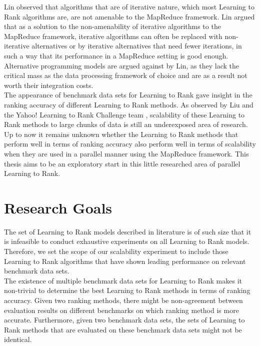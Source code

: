 Lin \cite{Lin2013} observed that algorithms that are of iterative nature, which most Learning to Rank algorithms are, are not amenable to the MapReduce framework. Lin argued that as a solution to the non-amenability of iterative algorithms to the MapReduce framework, iterative algorithms can often be replaced with non-iterative alternatives or by iterative alternatives that need fewer iterations, in such a way that its performance in a MapReduce setting is good enough. Alternative programming models are argued against by Lin, as they lack the critical mass as the data processing framework of choice and are as a result not worth their integration costs.\\

The appearance of benchmark data sets for Learning to Rank gave insight in the ranking accuracy of different Learning to Rank methods. As observed by Liu \cite{Liu2007} and the Yahoo! Learning to Rank Challenge team \cite{Chapelle2011b}, scalability of these Learning to Rank methods to large chunks of data is still an underexposed area of research. Up to now it remains unknown whether the Learning to Rank methods that perform well in terms of ranking accuracy also perform well in terms of scalability when they are used in a parallel manner using the MapReduce framework. This thesis aims to be an exploratory start in this little researched area of parallel Learning to Rank.\\

\section{Research Goals}
\label{sec:goals}
The set of Learning to Rank models described in literature is of such size that it is infeasible to conduct exhaustive experiments on all Learning to Rank models. Therefore, we set the scope of our scalability experiment to include those Learning to Rank algorithms that have shown leading performance on relevant benchmark data sets.\\

The existence of multiple benchmark data sets for Learning to Rank makes it non-trivial to determine the best Learning to Rank methods in terms of ranking accuracy. Given two ranking methods, there might be non-agreement between evaluation results on different benchmarks on which ranking method is more accurate. Furthermore, given two benchmark data sets, the sets of Learning to Rank methods that are evaluated on these benchmark data sets might not be identical.\\

